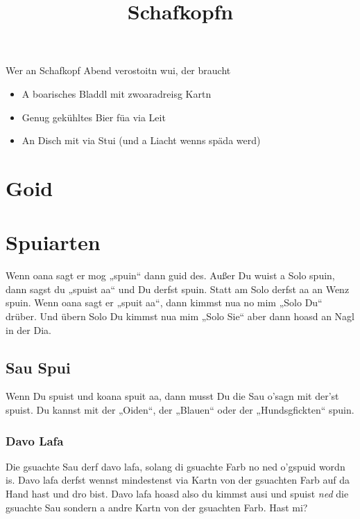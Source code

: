 \documentclass[11pt,a4paper]{scrartcl}		%
\title{Schafkopfn}
\makeatletter
\def\maketitle{
	\begin{center}
		\textbf{\huge \@title}
	\end{center}
}
\makeatother
\begin{document}

	\maketitle


	
	Wer an Schafkopf Abend verostoitn wui, der braucht
	\begin{itemize}
		\item A boarisches Bladdl mit zwoaradreisg Kartn
		\item Genug gekühltes Bier füa via Leit
		\item An Disch mit via Stui (und a Liacht wenns späda werd)
	\end{itemize}


	\section{Goid}



	\section{Spuiarten}
	Wenn oana sagt er mog „spuin“ dann guid des. Außer Du wuist a Solo spuin, dann sagst du „spuist aa“ und Du derfst spuin. Statt am Solo derfst aa an Wenz spuin. Wenn oana sagt er „spuit aa“, dann kimmst nua no mim „Solo Du“ drüber. Und übern Solo Du kimmst nua mim „Solo Sie“ aber dann hoasd an Nagl in der Dia.


		\subsection{Sau Spui}
		Wenn Du spuist und koana spuit aa, dann musst Du die Sau o'sagn mit der'st spuist.
		Du kannst mit der „Oiden“, der „Blauen“ oder der „Hundsgfickten“ spuin.


			\subsubsection{Davo Lafa}
			Die gsuachte Sau derf davo lafa, solang di gsuachte Farb no ned o'gspuid wordn is. Davo lafa derfst wennst mindestenst via Kartn von der gsuachten Farb auf da Hand hast und dro bist. Davo lafa hoasd also du kimmst ausi und spuist \emph{ned} die gsuachte Sau sondern a andre Kartn von der gsuachten Farb. Hast mi?
\end{document}

